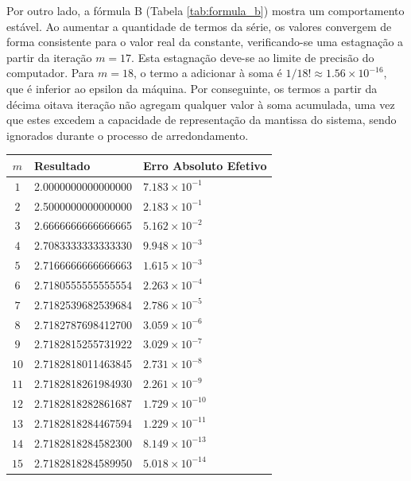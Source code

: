 \documentclass{article}
\begin{document}
Por outro lado, a fórmula B (Tabela \ref{tab:formula_b}) mostra um comportamento estável. Ao aumentar a quantidade de termos da série, os valores convergem de forma consistente para o valor real da constante, verificando-se uma estagnação a partir da iteração $m=17$. Esta estagnação deve-se ao limite de precisão do computador. Para $m=18$, o termo a adicionar à soma é $1/18! \approx 1.56 \times 10^{-16}$, que é inferior ao epsilon da máquina. Por conseguinte, os termos a partir da décima oitava iteração não agregam qualquer valor à soma acumulada, uma vez que estes excedem a capacidade de representação da mantissa do sistema, sendo ignorados durante o processo de arredondamento.

\begin{table}[H]
    \centering
    \begin{tabular}{|c|l|l|}
        \hline
        \textbf{$m$} & \textbf{Resultado} & \textbf{Erro Absoluto Efetivo} \\ \hline
        $1$  & 2.0000000000000000 & $7.183 \times 10^{-1}$ \\ \hline
        $2$  & 2.5000000000000000 & $2.183 \times 10^{-1}$ \\ \hline
        $3$  & 2.6666666666666665 & $5.162 \times 10^{-2}$ \\ \hline
        $4$  & 2.7083333333333330 & $9.948 \times 10^{-3}$ \\ \hline
        $5$  & 2.7166666666666663 & $1.615 \times 10^{-3}$ \\ \hline
        $6$  & 2.7180555555555554 & $2.263 \times 10^{-4}$ \\ \hline
        $7$  & 2.7182539682539684 & $2.786 \times 10^{-5}$ \\ \hline
        $8$  & 2.7182787698412700 & $3.059 \times 10^{-6}$ \\ \hline
        $9$  & 2.7182815255731922 & $3.029 \times 10^{-7}$ \\ \hline
        $10$ & 2.7182818011463845 & $2.731 \times 10^{-8}$ \\ \hline
        $11$ & 2.7182818261984930 & $2.261 \times 10^{-9}$ \\ \hline
        $12$ & 2.7182818282861687 & $1.729 \times 10^{-10}$ \\ \hline
        $13$ & 2.7182818284467594 & $1.229 \times 10^{-11}$ \\ \hline
        $14$ & 2.7182818284582300 & $8.149 \times 10^{-13}$ \\ \hline
        $15$ & 2.7182818284589950 & $5.018 \times 10^{-14}$ \\ \hline

\end{tabular}
\end{table}
\end{document}

